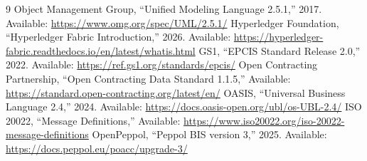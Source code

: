 \documentclass[11pt]{article}
\begin{document}
\begin{thebibliography}{9}
 Object Management Group, ``Unified Modeling Language 2.5.1,'' 2017. Available: \url{https://www.omg.org/spec/UML/2.5.1/}
 Hyperledger Foundation, ``Hyperledger Fabric Introduction,'' 2026. Available: \url{https://hyperledger-fabric.readthedocs.io/en/latest/whatis.html}
 GS1, ``EPCIS Standard Release 2.0,'' 2022. Available: \url{https://ref.gs1.org/standards/epcis/}
 Open Contracting Partnership, ``Open Contracting Data Standard 1.1.5,'' Available: \url{https://standard.open-contracting.org/latest/en/}
 OASIS, ``Universal Business Language 2.4,'' 2024. Available: \url{https://docs.oasis-open.org/ubl/os-UBL-2.4/}
 ISO 20022, ``Message Definitions,'' Available: \url{https://www.iso20022.org/iso-20022-message-definitions}
 OpenPeppol, ``Peppol BIS version 3,'' 2025. Available: \url{https://docs.peppol.eu/poacc/upgrade-3/}
\end{thebibliography}
\end{document}

